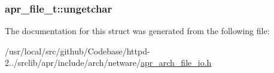 \subsubsection[{\texorpdfstring{ungetchar}{ungetchar}}]{ apr\+\_\+file\+\_\+t\+::ungetchar}\hypertarget{structapr__file__t_a72c2e1a30f41881f7bfacf966f024081}{}\label{structapr__file__t_a72c2e1a30f41881f7bfacf966f024081}


The documentation for this struct was generated from the following file\+:\begin{DoxyCompactItemize}
\item 
/usr/local/src/github/\+Codebase/httpd-\/2../srclib/apr/include/arch/netware/\hyperlink{netware_2apr__arch__file__io_8h}{apr\+\_\+arch\+\_\+file\+\_\+io.\+h}\end{DoxyCompactItemize}
